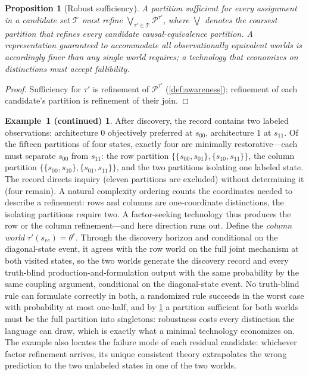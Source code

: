 \documentclass[11pt]{article}
\newtheorem{proposition}[assumption]{Proposition}
\theoremstyle{definition}
\newtheorem*{excont}{Example~1 (continued)}
\begin{document}
\begin{proposition}[Robust sufficiency]
\label{prop:robust-sufficiency}
A partition sufficient for every assignment in a candidate set $\mathcal T$ must refine $\bigvee_{\tau'\in\mathcal T}\mathcal P^{\tau'}$, where $\bigvee$ denotes the coarsest partition that refines every candidate causal-equivalence partition.
A representation guaranteed to accommodate all observationally equivalent worlds is accordingly finer than any single world requires; a technology that economizes on distinctions must accept fallibility.
\end{proposition}

\begin{proof}
Sufficiency for $\tau'$ is refinement of $\mathcal P^{\tau'}$ (\cref{def:awareness}); refinement of each candidate's partition is refinement of their join.
\end{proof}

\begin{excont}
After discovery, the record contains two labeled observations: architecture $0$ objectively preferred at $s_{00}$, architecture $1$ at $s_{11}$.
Of the fifteen partitions of four states, exactly four are minimally restorative---each must separate $s_{00}$ from $s_{11}$: the row partition $\{\{s_{00},s_{01}\},\{s_{10},s_{11}\}\}$, the column partition $\{\{s_{00},s_{10}\},\{s_{01},s_{11}\}\}$, and the two partitions isolating one labeled state.
The record directs inquiry (eleven partitions are excluded) without determining it (four remain).
A natural complexity ordering counts the coordinates needed to describe a refinement: rows and columns are one-coordinate distinctions, the isolating partitions require two.
A factor-seeking technology thus produces the row or the column refinement---and here direction runs out.
Define the \emph{column world} $\tau'(s_{rc})=\theta^{c}$.
Through the discovery horizon and conditional on the diagonal-state event, it agrees with the row world on the full joint mechanism at both visited states, so the two worlds generate the discovery record and every truth-blind production-and-formulation output with the same probability by the same coupling argument, conditional on the diagonal-state event.
No truth-blind rule can formulate correctly in both, a randomized rule succeeds in the worst case with probability at most one-half, and by \cref{prop:robust-sufficiency} a partition sufficient for both worlds must be the full partition into singletons: robustness costs every distinction the language can draw, which is exactly what a minimal technology economizes on.
The example also locates the failure mode of each residual candidate: whichever factor refinement arrives, its unique consistent theory extrapolates the wrong prediction to the two unlabeled states in one of the two worlds.
\end{excont}
\end{document}
